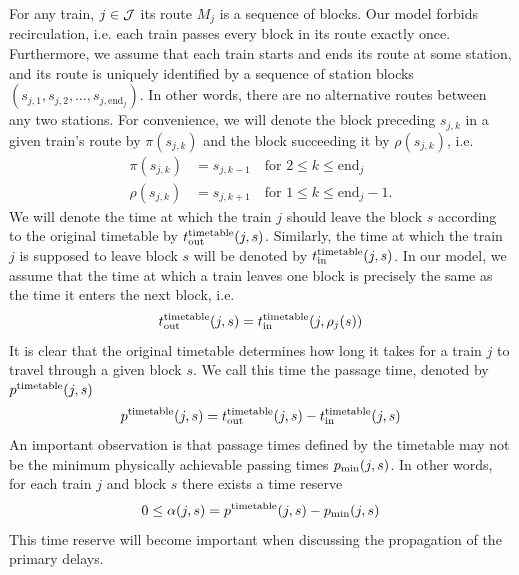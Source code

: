 For any train, $j \in \mathcal{J}$ its route $M_j$ is a sequence of blocks. Our model forbids recirculation,
i.e. each train passes every block in its route exactly once. Furthermore, we assume that each train
starts and ends its route at some station, and its route is uniquely identified by a sequence of
station blocks $\left(s_{j,1}, s_{j, 2}, \ldots, s_{j, \mbox{end}_j}\right)$. In other words, there
are no alternative routes between any two stations. For convenience, we will denote the block
preceding $s_{j,k}$ in a given train's route by $\pi(s_{j,k})$ and the block succeeding it by
$\rho(s_{j,k})$, i.e.
\begin{align}
	\pi(s_{j,k})  & = s_{j,k-1} \quad \mbox{for } 2 \le k \le \mbox{end}_j      \\
	\rho(s_{j,k}) & = s_{j,k+1} \quad \mbox{for } 1 \le k \le \mbox{end}_j - 1.
\end{align}
We will denote the time at which the train $j$ should leave the block $s$ according to the original
timetable by $t_\text{out}^\text{timetable}(j, s)$. Similarly, the time at which the train $j$ is supposed to leave block $s$
will be denoted by $t_\text{in}^\text{timetable}(j, s)$. In our model, we assume that the time at which a train leaves one
block is precisely the same as the time it enters the next block, i.e.
\begin{equation}
	t_\text{out}^\text{timetable}(j, s) = t_\text{in}^\text{timetable}(j, \rho_j(s))
\end{equation}
It is clear that the original timetable determines how long it takes for a train $j$ to travel
through a given block $s$. We call this time the passage time, denoted by $p^\text{timetable}(j, s)$
\begin{equation}
	p^\text{timetable}(j, s) = t_\text{out}^\text{timetable}(j, s) - t_\text{in}^\text{timetable}(j, s)
\end{equation}
An important observation is that passage times defined by the timetable may not be the minimum physically
achievable passing times $p_\text{min}(j, s)$. In other words, for each train $j$ and block $s$ there
exists a time reserve
\begin{equation}
	\label{eq:pt}
	0 \le \alpha(j, s) = p^\text{timetable}(j, s) - p_\text{min}(j, s)
\end{equation}
This time reserve will become important when discussing the propagation of the primary delays.

